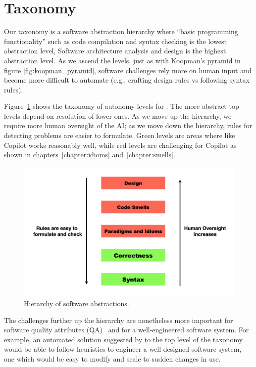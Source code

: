 \section{Taxonomy}
\label{taxonomy}
Our taxonomy is a software abstraction hierarchy where ``basic programming functionality'' such as code compilation and syntax checking is the lowest abstraction level,
Software architecture analysis and design is the highest abstraction level.
As we ascend the levels, just as with Koopman's pyramid in figure \ref{fig:koopman_pyramid}, 
software challenges rely more on human input and become more difficult to automate (e.g., crafting design rules vs following syntax rules).

Figure~\ref{fig:taxonomy} shows the taxonomy of autonomy levels for \cct{}.  The more abstract top levels depend on resolution of lower ones. As we move up the hierarchy, we require more human oversight of the AI; as we move down the hierarchy, rules for detecting problems are easier to formulate. Green levels are areas where \cct{} like Copilot works reasonably well, while red levels are challenging for Copilot as shown in chapters~\ref{chapter:idioms} and~\ref{chapter:smells}.

\begin{figure}[hbt!]
    \centering
    \includegraphics[width=\linewidth]{Figures/taxonomy.png}
    \caption{Hierarchy of software abstractions.}
    \label{fig:taxonomy}
\end{figure}

The challenges further up the hierarchy are nonetheless more important for software quality attributes (QA)~\cite{Ernst2017} and for a well-engineered software system.
For example, an automated solution suggested by \cct{} to the top level of the taxonomy would be able to follow heuristics to engineer a well designed software system, one which would be easy to modify and scale to sudden changes in use.